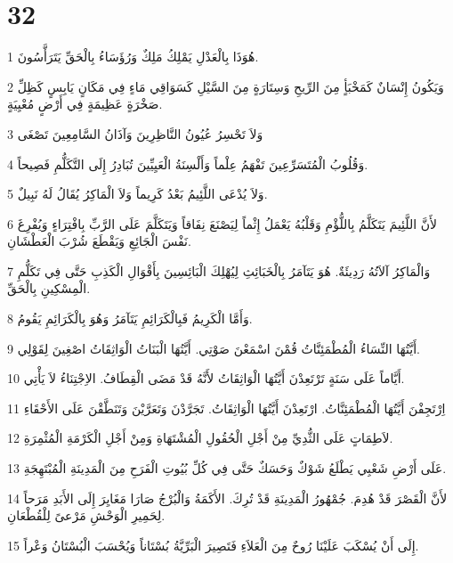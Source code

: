 \chapter{32}

\par 1 هُوَذَا بِالْعَدْلِ يَمْلِكُ مَلِكٌ وَرُؤَسَاءُ بِالْحَقِّ يَتَرَأَّسُونَ.
\par 2 وَيَكُونُ إِنْسَانٌ كَمَخْبَأٍ مِنَ الرِّيحِ وَسِتَارَةٍ مِنَ السَّيْلِ كَسَوَاقِي مَاءٍ فِي مَكَانٍ يَابِسٍ كَظِلِّ صَخْرَةٍ عَظِيمَةٍ فِي أَرْضٍ مُعْيِيَةٍ.
\par 3 وَلاَ تَحْسِرُ عُيُونُ النَّاظِرِينَ وَآذَانُ السَّامِعِينَ تَصْغَى
\par 4 وَقُلُوبُ الْمُتَسَرِّعِينَ تَفْهَمُ عِلْماً وَأَلْسِنَةُ الْعَيِيِّينَ تُبَادِرُ إِلَى التَّكَلُّمِ فَصِيحاً.
\par 5 وَلاَ يُدْعَى اللَّئِيمُ بَعْدُ كَرِيماً وَلاَ الْمَاكِرُ يُقَالُ لَهُ نَبِيلٌ.
\par 6 لأَنَّ اللَّئِيمَ يَتَكَلَّمُ بِاللُّؤْمِ وَقَلْبُهُ يَعْمَلُ إِثْماً لِيَصْنَعَ نِفَاقاً وَيَتَكَلَّمَ عَلَى الرَّبِّ بِافْتِرَاءٍ وَيُفْرِغَ نَفْسَ الْجَائِعِ وَيَقْطَعَ شُرْبَ الْعَطْشَانِ.
\par 7 وَالْمَاكِرُ آلاَتُهُ رَدِيئَةٌ. هُوَ يَتَآمَرُ بِالْخَبَائِثِ لِيُهْلِكَ الْبَائِسِينَ بِأَقْوَالِ الْكَذِبِ حَتَّى فِي تَكَلُّمِ الْمِسْكِينِ بِالْحَقِّ.
\par 8 وَأَمَّا الْكَرِيمُ فَبِالْكَرَائِمِ يَتَآمَرُ وَهُوَ بِالْكَرَائِمِ يَقُومُ.
\par 9 أَيَّتُهَا النِّسَاءُ الْمُطْمَئِنَّاتُ قُمْنَ اسْمَعْنَ صَوْتِي. أَيَّتُهَا الْبَنَاتُ الْوَاثِقَاتُ اصْغِينَ لِقَوْلِي.
\par 10 أَيَّاماً عَلَى سَنَةٍ تَرْتَعِدْنَ أَيَّتُهَا الْوَاثِقَاتُ لأَنَّهُ قَدْ مَضَى الْقِطَافُ. الاِجْتِنَاءُ لاَ يَأْتِي.
\par 11 اِرْتَجِفْنَ أَيَّتُهَا الْمُطْمَئِنَّاتُ. ارْتَعِدْنَ أَيَّتُهَا الْوَاثِقَاتُ. تَجَرَّدْنَ وَتَعَرَّيْنَ وَتَنَطَّقْنَ عَلَى الأَحْقَاءِ
\par 12 لاَطِمَاتٍ عَلَى الثُّدِيِّ مِنْ أَجْلِ الْحُقُولِ الْمُشْتَهَاةِ وَمِنْ أَجْلِ الْكَرْمَةِ الْمُثْمِرَةِ.
\par 13 عَلَى أَرْضِ شَعْبِي يَطْلَعُ شَوْكٌ وَحَسَكٌ حَتَّى فِي كُلِّ بُيُوتِ الْفَرَحِ مِنَ الْمَدِينَةِ الْمُبْتَهِجَةِ.
\par 14 لأَنَّ الْقَصْرَ قَدْ هُدِمَ. جُمْهُورُ الْمَدِينَةِ قَدْ تُرِكَ. الأَكَمَةُ وَالْبُرْجُ صَارَا مَغَايِرَ إِلَى الأَبَدِ مَرَحاً لِحَمِيرِ الْوَحْشِ مَرْعىً لِلْقُطْعَانِ.
\par 15 إِلَى أَنْ يُسْكَبَ عَلَيْنَا رُوحٌ مِنَ الْعَلاَءِ فَتَصِيرَ الْبَرِّيَّةُ بُسْتَاناً وَيُحْسَبَ الْبُسْتَانُ وَعْراً.
